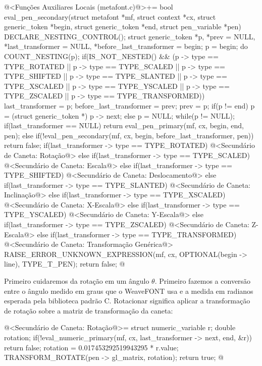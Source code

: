 {{{{{{\iniciocodigo
@<Funções Auxiliares Locais (metafont.c)@>+=
bool eval_pen_secondary(struct metafont *mf, struct context *cx,
                        struct generic_token *begin,
                        struct generic_token *end,
                        struct pen_variable *pen){
  DECLARE_NESTING_CONTROL();
  struct generic_token *p, *prev = NULL, *last_transformer = NULL,
                       *before_last_transformer = begin;
  p = begin;
  do{
    COUNT_NESTING(p);
    if(IS_NOT_NESTED() && (p -> type == TYPE_ROTATED ||
       p -> type == TYPE_SCALED || p -> type == TYPE_SHIFTED ||
       p -> type == TYPE_SLANTED || p -> type == TYPE_XSCALED ||
       p -> type == TYPE_YSCALED || p -> type == TYPE_ZSCALED ||
       p -> type == TYPE_TRANSFORMED)){
      last_transformer = p;
      before_last_transformer = prev;
    }
    prev = p;
    if(p != end)
      p = (struct generic_token *) p -> next;
    else
      p = NULL;
  }while(p != NULL);
  if(last_transformer == NULL)
    return eval_pen_primary(mf, cx, begin, end, pen);
  else{
    if(!eval_pen_secondary(mf, cx, begin, before_last_transformer, pen))
      return false;
    if(last_transformer -> type == TYPE_ROTATED){
      @<Secundário de Caneta: Rotação@>
    }
    else if(last_transformer -> type == TYPE_SCALED){
      @<Secundário de Caneta: Escala@>
    }
    else if(last_transformer -> type == TYPE_SHIFTED){
      @<Secundário de Caneta: Deslocamento@>
    }
    else if(last_transformer -> type == TYPE_SLANTED){
      @<Secundário de Caneta: Inclinação@>
    }
    else if(last_transformer -> type == TYPE_XSCALED){
      @<Secundário de Caneta: X-Escala@>
    }
    else if(last_transformer -> type == TYPE_YSCALED){
      @<Secundário de Caneta: Y-Escala@>
    }
    else if(last_transformer -> type == TYPE_ZSCALED){
      @<Secundário de Caneta: Z-Escala@>
    }
    else if(last_transformer -> type == TYPE_TRANSFORMED){
      @<Secundário de Caneta: Transformação Genérica@>
    }
    RAISE_ERROR_UNKNOWN_EXPRESSION(mf, cx, OPTIONAL(begin -> line),
                                   TYPE_T_PEN);
    return false;
  }
}
@
\fimcodigo

Primeiro cuidaremos da rotação em um ângulo $\theta$. Primeiro fazemos
a conversão entre o ângulo medido em graus que o WeaveFONT usa e a
medida em radianos esperada pela biblioteca padrão C. Rotacionar
significa aplicar a transformação de rotação sobre a matriz de
transformação da caneta:

\iniciocodigo
@<Secundário de Caneta: Rotação@>=
struct numeric_variable r;
double rotation;
if(!eval_numeric_primary(mf, cx, last_transformer -> next, end, &r))
  return false;
rotation = 0.017453292519943295 * r.value;
TRANSFORM_ROTATE(pen -> gl_matrix, rotation);
return true;
@
\fimcodigo

}}}}}}
